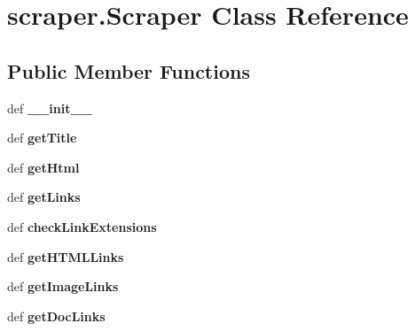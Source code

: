 \hypertarget{classscraper_1_1Scraper}{\section{scraper.\-Scraper Class Reference}
\label{classscraper_1_1Scraper}
}
\subsection*{Public Member Functions}
\begin{DoxyCompactItemize}
\item 
\hypertarget{classscraper_1_1Scraper_aab2046c61d81f97f4ca91f5d82a3e93b}{def {\bfseries \-\_\-\-\_\-init\-\_\-\-\_\-}}\label{classscraper_1_1Scraper_aab2046c61d81f97f4ca91f5d82a3e93b}

\item 
\hypertarget{classscraper_1_1Scraper_a1e363cf9112a9fab5c0de49b65a60ecf}{def {\bfseries get\-Title}}\label{classscraper_1_1Scraper_a1e363cf9112a9fab5c0de49b65a60ecf}

\item 
\hypertarget{classscraper_1_1Scraper_aa930865ef6567c2b8daf29295a9b61f5}{def {\bfseries get\-Html}}\label{classscraper_1_1Scraper_aa930865ef6567c2b8daf29295a9b61f5}

\item 
\hypertarget{classscraper_1_1Scraper_a83d540593a1fc58851432ad83b12992c}{def {\bfseries get\-Links}}\label{classscraper_1_1Scraper_a83d540593a1fc58851432ad83b12992c}

\item 
\hypertarget{classscraper_1_1Scraper_ab9a81ead951b05bc130cbacd3e41d95c}{def {\bfseries check\-Link\-Extensions}}\label{classscraper_1_1Scraper_ab9a81ead951b05bc130cbacd3e41d95c}

\item 
\hypertarget{classscraper_1_1Scraper_a7f0f648dc02464fcf0ccd275c54d5e27}{def {\bfseries get\-H\-T\-M\-L\-Links}}\label{classscraper_1_1Scraper_a7f0f648dc02464fcf0ccd275c54d5e27}

\item 
\hypertarget{classscraper_1_1Scraper_af9b594f2792b57580d7bc5aac581e85c}{def {\bfseries get\-Image\-Links}}\label{classscraper_1_1Scraper_af9b594f2792b57580d7bc5aac581e85c}

\item 
\hypertarget{classscraper_1_1Scraper_a01cd6bb9798fbabd8e08dbf464c242ce}{def {\bfseries get\-Doc\-Links}}\label{classscraper_1_1Scraper_a01cd6bb9798fbabd8e08dbf464c242ce}


\end{DoxyCompactItemize}
